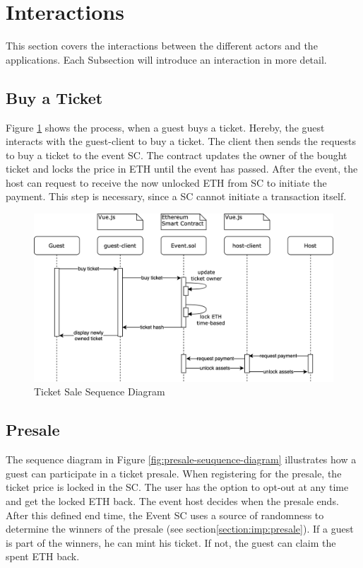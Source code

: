 \section{Interactions}
This section covers the interactions between the different actors and the applications. Each Subsection will introduce an interaction in more detail.

\subsection{Buy a Ticket}
Figure \ref{fig:buyticket-sequence-diagram} shows the process, when a guest buys a ticket. Hereby, the guest interacts with the guest-client to buy a ticket. The client then sends the requests to buy a ticket to the event SC. The contract updates the owner of the bought ticket and locks the price in ETH until the event has passed. After the event, the host can request to receive the now unlocked ETH from SC to initiate the payment. This step is necessary, since a SC cannot initiate a transaction itself.
\begin{figure}[H]
    \centering
    \includegraphics[width=16cm]{design/diagrams/BuyTicket.png}
    \caption{Ticket Sale Sequence Diagram}
    \label{fig:buyticket-sequence-diagram}
\end{figure}

\subsection{Presale}
The sequence diagram in Figure \ref{fig:presale-seuquence-diagram} illustrates how a guest can participate in a ticket presale. When registering for the presale, the ticket price is locked in the SC. The user has the option to opt-out at any time and get the locked ETH back. The event host decides when the presale ends. After this defined end time, the Event SC uses a source of randomness to determine the winners of the presale (see section\ref{section:imp:presale}). If a guest is part of the winners, he can mint his ticket. If not, the guest can claim the spent ETH back.

